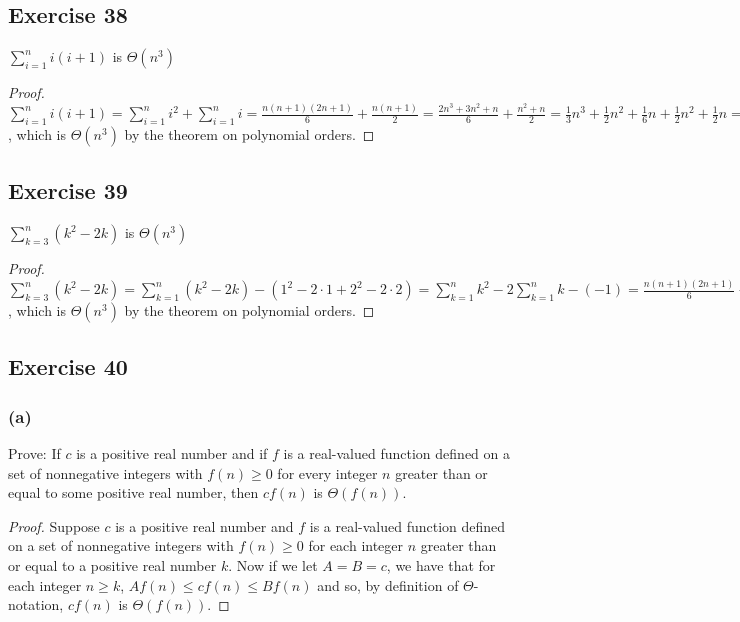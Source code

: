 \documentclass[14pt]{extarticle}
\newcommand{\dps}{\displaystyle}
\begin{document}
\subsection{Exercise 38}
\(\dps \sum_{i=1}^{n} i(i+1)\) is \(\Theta(n^3)\)

\begin{proof}
\(\dps \sum_{i=1}^{n} i(i+1) = \sum_{i=1}^{n} i^2 + \sum_{i=1}^{n} i = \frac{n(n+1)(2n+1)}{6} + \frac{n(n+1)}{2} = 
\frac{2n^3+3n^2+n}{6} + \frac{n^2 + n}{2} = \frac{1}{3}n^3 + \frac{1}{2}n^2 + \frac{1}{6}n + \frac{1}{2}n^2 + \frac{1}{2}n 
= \frac{1}{3}n^3 + n^2 + \frac{2}{3}n\), which is \(\Theta (n^3)\) by the theorem on polynomial orders.
\end{proof}

\subsection{Exercise 39}
\(\dps \sum_{k=3}^{n} (k^2-2k)\) is \(\Theta(n^3)\)

\begin{proof}
\(\dps \sum_{k=3}^{n} (k^2-2k) = \sum_{k=1}^{n} (k^2-2k) - (1^2 - 2 \cdot 1 + 2^2 - 2 \cdot 2) = \sum_{k=1}^{n} k^2 - 
2\sum_{k=1}^{n} k - (-1) = \frac{n(n+1)(2n+1)}{6} - 2\cdot\frac{n(n+1)}{2} + 1 = \frac{2n^3 + 3n^2 + n}{6} + n^2 + 
n + 1 = \frac{1}{3}n^3 + \frac{3}{2}n^2 + \frac{7}{6}n + 1\), which is \(\Theta (n^3)\) by the theorem on polynomial orders.
\end{proof}

\subsection{Exercise 40}
\subsubsection{(a)}
Prove: If \(c\) is a positive real number and if \(f\) is a real-valued function defined on a set of nonnegative integers 
with \(f(n) \geq 0\) for every integer \(n\) greater than or equal to some positive real number, then \(cf(n)\) is 
\(\Theta(f(n))\).

\begin{proof}
Suppose \(c\) is a positive real number and \(f\) is a real-valued function defined on a set of nonnegative integers with 
\(f(n) \geq 0\) for each integer \(n\) greater than or equal to a positive real number \(k\). Now if we let \(A = B = c\), 
we have that for each integer \(n \geq k\), \(Af(n) \leq cf(n) \leq Bf(n)\) and so, by definition of \(\Theta\)-notation, 
\(cf(n)\) is \(\Theta(f(n))\).
\end{proof}
\end{document}
